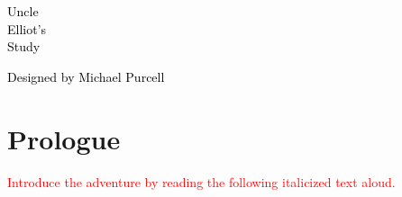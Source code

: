 \documentclass[a6paper, parskip=half, DIV=14, 12pt]{scrartcl}
\begin{document}
{%
\thispagestyle{empty}
		\enlargethispage{3\baselineskip} %

\begin{center}
{
\setmainfont[Scale=2]{Special Elite}
\Huge
\textcolor{black}{Uncle\\[0.75ex]Elliot's\\[0.75ex]Study}
}
\end{center}

\vfill

\begin{center}
\end{center}

\vfill{}

\begin{center}
{
\setmainfont{Bilbo Swash Caps}
\LARGE
\textcolor{black}{Designed by Michael Purcell}
}
\end{center}
}


\newpage

\section*{Prologue}


\textcolor{Red}{Introduce the adventure by reading the following italicized text aloud.}
\end{document}
